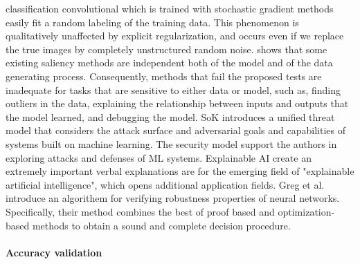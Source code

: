 classification convolutional which is trained with stochastic gradient methods easily fit a random labeling of the training data. This phenomenon is qualitatively unaffected by explicit regularization, and occurs even if we replace the true images by completely unstructured random noise. \cite{adebayo2018sanity} shows that some existing saliency methods are independent both of the model and of the data generating process. Consequently, methods that fail the proposed tests are inadequate for tasks that are sensitive to either data or model, such as, finding outliers in the data, explaining the relationship between inputs and outputs that the model learned, and debugging the model. SoK \cite{papernot2016towards} introduces a unified threat model that considers the attack surface and adversarial goals and capabilities of systems built on machine learning. The security model support the authors in exploring attacks and defenses of ML systems. Explainable AI \cite{goebel2018explainable} create an extremely important verbal explanations are  for the emerging field of "explainable artificial intelligence", which opens additional application fields. Greg et al. \cite{anderson2019optimization} introduce an algorithem for verifying robustness properties of neural networks. Specifically, their method combines the best of proof based and optimization-based methods to obtain a sound and complete decision procedure.  

\textbf{}
\paragraph{\textbf{Accuracy validation}}
